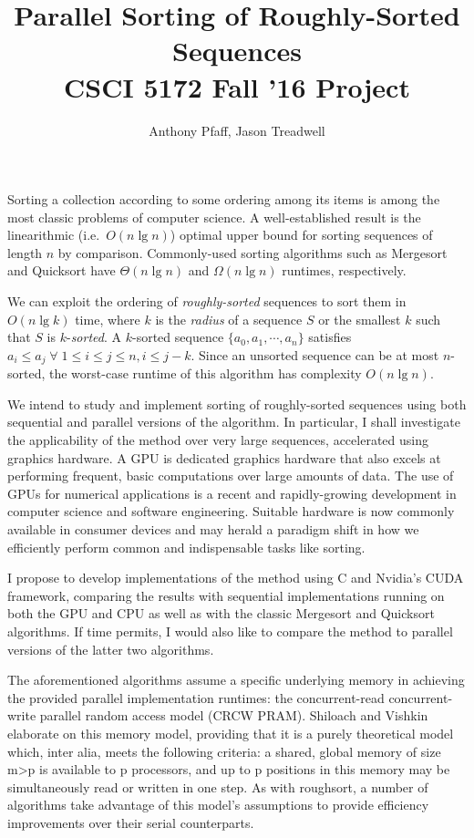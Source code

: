 \documentclass[letterpaper, 12pt]{article}
\title{Parallel Sorting of Roughly-Sorted Sequences\\CSCI 5172 Fall '16 Project}
\author{Anthony Pfaff, Jason Treadwell}
\begin{document}
\maketitle

Sorting a collection according to some ordering among its items is among the most classic problems of computer science.
A well-established result is the linearithmic  (i.e.\ $O(n \lg n)$) optimal upper bound for sorting sequences of length $n$ by
  comparison.
Commonly-used sorting algorithms such as Mergesort and Quicksort have $\Theta(n \lg n)$ and $\Omega(n \lg n)$ runtimes,
  respectively.

We can exploit the ordering of \textit{roughly-sorted} sequences to sort them in $O(n \lg k)$ time, where $k$ is the
  \textit{radius} of a sequence $S$ or the smallest $k$ such that $S$ is $k$-\textit{sorted}.\cite{altman89}
A $k$-sorted sequence $\{a_0, a_1, \cdots, a_n\}$ satisfies $a_i \leq a_j \;\forall\; 1 \leq i \leq j \leq n, i \leq j - k$.
Since an unsorted sequence can be at most $n$-sorted, the worst-case runtime of this algorithm has complexity $O(n \lg n)$.

We intend to study and implement sorting of roughly-sorted sequences using both sequential and parallel\cite{altman90} versions
  of the algorithm. In particular, I shall investigate the applicability of the method over very large sequences,
  accelerated using graphics hardware. A GPU is dedicated graphics hardware that also excels at performing frequent, basic
  computations over large amounts of data. The use of GPUs for numerical applications is a recent and rapidly-growing development
  in computer science and software engineering. Suitable hardware is now commonly available in consumer devices and may herald a
  paradigm shift in how we efficiently perform common and indispensable tasks like sorting.

I propose to develop implementations of the method using C and Nvidia's CUDA framework, comparing the results with sequential
  implementations running on both the GPU and CPU as well as with the classic Mergesort and Quicksort algorithms. If time
  permits, I would also like to compare the method to parallel versions of the latter two algorithms.

The aforementioned algorithms assume a specific underlying memory in achieving the provided parallel implementation runtimes: the concurrent-read concurrent-write parallel random access model (CRCW PRAM).  Shiloach and Vishkin elaborate on this memory model, providing that it is a purely theoretical model which, inter alia, meets the following criteria: a shared, global memory of size m\textgreater p is available to p processors, and up to p positions in this memory may be simultaneously read or written in one step\cite{Shiloach1981}.  As with roughsort, a number of algorithms take advantage of this model\textquoteright s assumptions to provide efficiency improvements over their serial counterparts\cite{Shiloach1982}\cite{raj1989}.
\end{document}
